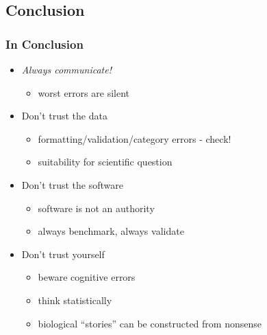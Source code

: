 
\subsection{Conclusion}
\begin{frame}
  \frametitle{In Conclusion}
  \begin{itemize}
    \item \emph{Always communicate!}
      \begin{itemize}
        \item worst errors are silent
      \end{itemize}	  
    \item Don't trust the data
    \begin{itemize}
      \item formatting/validation/category errors - check!
      \item suitability for scientific question
    \end{itemize}
    \item Don't trust the software
    \begin{itemize}
      \item software is not an authority
      \item always benchmark, always validate
    \end{itemize}
    \item Don't trust yourself
    \begin{itemize}
      \item beware cognitive errors
      \item think statistically
      \item biological ``stories'' can be constructed from nonsense
    \end{itemize}	  
  \end{itemize}
\end{frame}
